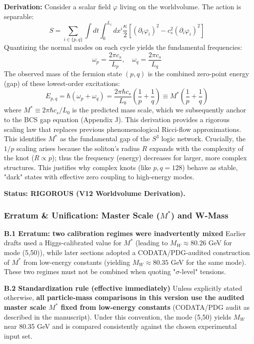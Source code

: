 \documentclass[a4paper,12pt]{article}
\begin{document}
\textbf{Derivation:}
Consider a scalar field $\varphi$ living on the worldvolume. The action is separable:
\begin{equation}
    S = \sum_{i \in \{p,q\}} \int dt \int_0^{L_i} dx^i \frac{\kappa}{2} \left[ (\partial_t \varphi_i)^2 - c_s^2 (\partial_i \varphi_i)^2 \right]
\end{equation}
Quantizing the normal modes on each cycle yields the fundamental frequencies:
\begin{equation}
    \omega_p = \frac{2\pi c_s}{L_p}, \quad \omega_q = \frac{2\pi c_s}{L_q}
\end{equation}
The observed mass of the fermion state $(p, q)$ is the combined zero-point energy (gap) of these lowest-order excitations:
\begin{equation}
    E_{p,q} = \hbar (\omega_p + \omega_q) = \frac{2\pi \hbar c_s}{L_0} \left( \frac{1}{p} + \frac{1}{q} \right) \equiv M^* \left( \frac{1}{p} + \frac{1}{q} \right)
\end{equation}
where $M^* \equiv 2\pi \hbar c_s / L_0$ is the predicted mass scale, which we subsequently anchor to the BCS gap equation (Appendix J). This derivation provides a rigorous scaling law that replaces previous phenomenological Ricci-flow approximations.
This identifies $M^*$ as the fundamental gap of the $S^3$ logic network. Crucially, the $1/p$ scaling arises because the soliton's radius $R$ expands with the complexity of the knot ($R \propto p$); thus the frequency (energy) decreases for larger, more complex structures. This justifies why complex knots (like $p,q=128$) behave as stable, "dark" states with effective zero coupling to high-energy modes.

\textbf{Status: RIGOROUS (V12 Worldvolume Derivation).}


\subsubsection{Erratum \& Unification: Master Scale ($M^*$) and W-Mass}

\textbf{B.1 Erratum: two calibration regimes were inadvertently mixed}
Earlier drafts used a Higgs-calibrated value for $M^*$ (leading to $M_W \approx 80.26$ GeV for mode (5,50)), while later sections adopted a CODATA/PDG-audited construction of $M^*$ from low-energy constants (yielding $M_W \approx 80.35$ GeV for the same mode). These two regimes must not be combined when quoting "$\sigma$-level" tensions.

\textbf{B.2 Standardization rule (effective immediately)}
Unless explicitly stated otherwise, \textbf{all particle-mass comparisons in this version use the audited master scale $M^*$ fixed from low-energy constants} (CODATA/PDG audit as described in the manuscript). Under this convention, the mode (5,50) yields $M_W$ near 80.35 GeV and is compared consistently against the chosen experimental input set.
\end{document}
